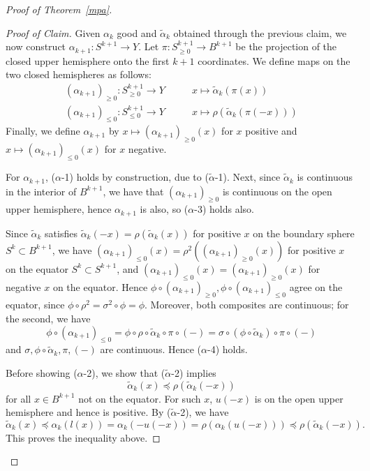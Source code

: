 \documentclass[11pt, reqno, english]{amsart}
\theoremstyle{plain}
\theoremstyle{definition}
\begin{document}
\begin{proof}[Proof of Theorem~\ref{mpa}]
\begin{proof}[Proof of Claim]
    Given $\alpha_{k}$ good and $\widetilde{\alpha}_{k}$ obtained through the
    previous claim, we now construct $\alpha_{k+1} \colon S^{k+1} \rightarrow
    Y$. Let $\pi\colon S^{k+1}_{\ge 0} \rightarrow B^{k+1}$ be the projection
    of the closed upper hemisphere onto the first $k + 1$ coordinates. We
    define maps on the two closed hemispheres as follows:
    \begin{align*}
      (\alpha_{k+1})_{\ge 0} \colon S^{k+1}_{\ge 0} \rightarrow Y &\qquad x
      \mapsto \widetilde{\alpha}_{k}(\pi(x))\\
      (\alpha_{k+1})_{\le 0} \colon S^{k+1}_{\le 0} \rightarrow Y &\qquad x
      \mapsto \rho(\widetilde{\alpha}_{k}(\pi(-x)))
    \end{align*}
    Finally, we define $\alpha_{k+1}$ by $x \mapsto (\alpha_{k+1})_{\ge 0}(x)$
    for $x$ positive and $x \mapsto (\alpha_{k+1})_{\le 0}(x)$ for $x$
    negative.

    For $\alpha_{k+1}$, ($\alpha$-1) holds by construction, due to
    ($\widetilde{\alpha}$-1). Next, since $\widetilde{\alpha}_{k}$ is
    continuous in the interior of $B^{k+1}$, we have that $(\alpha_{k+1})_{\ge
    0}$ is continuous on the open upper hemisphere, hence $\alpha_{k+1}$ is
    also, so ($\alpha$-3) holds also.

    Since $\widetilde{\alpha}_{k}$ satisfies $\widetilde{\alpha}_{k}(-x) =
    \rho(\widetilde{\alpha}_{k}(x))$ for positive $x$ on the boundary sphere
    $S^{k}\subset B^{k+1}$, we have $(\alpha_{k+1})_{\le 0}(x) =
    \rho^{2}((\alpha_{k+1})_{\ge 0}(x))$ for positive $x$ on the equator
    $S^{k}\subset S^{k+1}$, and $(\alpha_{k+1})_{\le 0}(x) =
    (\alpha_{k+1})_{\ge 0}(x)$ for negative $x$ on the equator. Hence $\phi
    \circ (\alpha_{k+1})_{\ge 0}, \phi \circ (\alpha_{k+1})_{\le 0}$ agree on
    the equator, since $\phi \circ \rho^{2} = \sigma^{2} \circ \phi = \phi$.
    Moreover, both composites are continuous; for the second, we have
    $$\phi \circ (\alpha_{k+1})_{\le 0} = \phi \circ \rho \circ
    \widetilde{\alpha}_{k} \circ \pi \circ (-) = \sigma \circ (\phi \circ
    \widetilde{\alpha}_{k}) \circ \pi \circ (-)$$
    and $\sigma, \phi \circ \widetilde{\alpha}_{k}, \pi, (-)$ are continuous.
    Hence ($\alpha$-4) holds.

    Before showing ($\alpha$-2), we show that ($\widetilde{\alpha}$-2) implies
    $$\widetilde{\alpha}_{k}(x) \preceq \rho(\widetilde{\alpha}_{k}(-x))$$
    for all $x \in B^{k+1}$ not on the equator. For such $x$, $u(-x)$ is on the
    open upper hemisphere and hence is positive. By ($\widetilde{\alpha}$-2),
    we have
    $$\widetilde{\alpha}_{k}(x) \preceq \alpha_{k}(l(x)) = \alpha_{k}(-u(-x)) =
    \rho(\alpha_{k}(u(-x))) \preceq \rho(\widetilde{\alpha}_{k}(-x)).$$
    This proves the inequality above.


\end{proof}
\end{proof}
\end{document}
